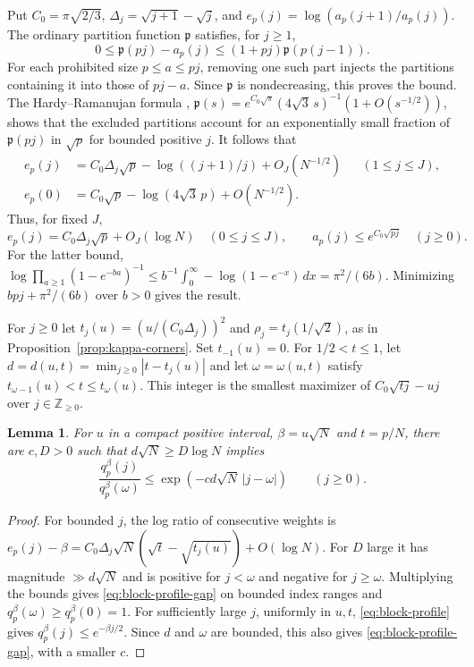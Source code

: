 \documentclass[11pt]{amsart}
\newtheorem{lemma}[theorem]{Lemma}
\theoremstyle{remark}
\newcommand{\Z}{\mathbb Z}
\begin{document}
Put \(C_0=\pi\sqrt{2/3}\), \(\Delta_j=\sqrt{j+1}-\sqrt j\), and
\(e_p(j)=\log(a_p(j+1)/a_p(j))\).
The ordinary partition function \(\mathfrak p\) satisfies, for \(j\ge1\),
\[
 0\le\mathfrak p(pj)-a_p(j)\le(1+pj)\mathfrak p(p(j-1)).
\]
For each prohibited size \(p\le a\le pj\), removing one such part
injects the partitions containing it into those of \(pj-a\). Since \(\mathfrak p\) is nondecreasing,
this proves the bound. The Hardy--Ramanujan formula \cite{hardy-ramanujan},
\(\mathfrak p(s)=e^{C_0\sqrt s}(4\sqrt3\,s)^{-1}(1+O(s^{-1/2}))\),
shows that the excluded partitions account for an exponentially small
fraction of \(\mathfrak p(pj)\) in \(\sqrt p\) for bounded positive \(j\).
It follows that
\begin{align}
 e_p(j)&=C_0\Delta_j\sqrt p-\log((j+1)/j)+O_J(N^{-1/2})
                 &&(1\le j\le J),\label{eq:block-profile-refined}\\
 e_p(0)&=C_0\sqrt p-\log(4\sqrt3\,p)+O(N^{-1/2}).\nonumber
\end{align}
Thus, for fixed \(J\),
\begin{equation}
 e_p(j)=C_0\Delta_j\sqrt p+O_J(\log N)\quad(0\le j\le J),
 \qquad a_p(j)\le e^{C_0\sqrt{pj}}\quad(j\ge0).
 \label{eq:block-profile}
\end{equation}
For the latter bound, \(\log\prod_{a\ge1}(1-e^{-ba})^{-1}
\le b^{-1}\int_0^\infty-\log(1-e^{-x})\,dx=\pi^2/(6b)\).
Minimizing \(bpj+\pi^2/(6b)\) over \(b>0\) gives the result.

For \(j\ge0\) let \(t_j(u)=(u/(C_0\Delta_j))^2\) and
\(\rho_j=t_j(1/\sqrt2)\), as in Proposition~\ref{prop:kappa-corners}.
Set \(t_{-1}(u)=0\). For \(1/2<t\le1\), let
\(d=d(u,t)=\min_{j\ge0}|t-t_j(u)|\) and let \(\omega=\omega(u,t)\)
satisfy \(t_{\omega-1}(u)<t\le t_\omega(u)\). This integer is the
smallest maximizer of \(C_0\sqrt{tj}-uj\) over \(j\in\Z_{\ge0}\).

\begin{lemma}
\label{lem:block-profile-gap}
For \(u\) in a compact positive interval, \(\beta=u\sqrt N\) and \(t=p/N\),
there are \(c,D>0\) such that \(d\sqrt N\ge D\log N\) implies
\begin{equation}
 \frac{q_p^\beta(j)}{q_p^\beta(\omega)}
 \le \exp(-cd\sqrt N\,|j-\omega|)\qquad(j\ge0).
 \label{eq:block-profile-gap}
\end{equation}
\end{lemma}

\begin{proof}
For bounded \(j\), the log ratio of consecutive weights is
\(e_p(j)-\beta=C_0\Delta_j\sqrt N(\sqrt t-\sqrt{t_j(u)})+O(\log N)\).
For \(D\) large it has magnitude \(\gg d\sqrt N\) and is positive for
\(j<\omega\) and negative for \(j\ge\omega\). Multiplying the bounds gives
\eqref{eq:block-profile-gap} on bounded index ranges and
\(q_p^\beta(\omega)\ge q_p^\beta(0)=1\). For sufficiently large \(j\),
uniformly in \(u,t\), \eqref{eq:block-profile} gives
\(q_p^\beta(j)\le e^{-\beta j/2}\). Since \(d\) and \(\omega\) are bounded,
this also gives \eqref{eq:block-profile-gap}, with a smaller \(c\).
\end{proof}
\end{document}
